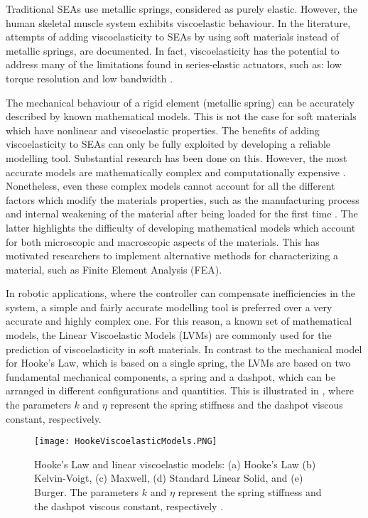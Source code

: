 Traditional SEAs use metallic springs, considered as purely elastic. However, the human skeletal muscle system exhibits viscoelastic behaviour. In the literature, attempts of adding viscoelasticity to SEAs by using soft materials instead of metallic springs, are documented. In fact, viscoelasticity has the potential to address many of the limitations found in series-elastic actuators, such as: low torque resolution and low bandwidth \cite{martins2015polyurethane,tagliamonte2014rendering,schepelmann2014compact}. 

The mechanical behaviour of a rigid element (metallic spring) can be accurately described by known mathematical models. This is not the case for soft materials which have nonlinear and viscoelastic properties. The benefits of adding viscoelasticity to SEAs can only be fully exploited by developing a  reliable modelling tool. Substantial research has been done on this. However, the most accurate models are mathematically complex and computationally expensive \cite{xu2014mathematical,ciniello2017identifying,lu2017constitutive}. Nonetheless, even these complex models cannot account for all the different factors which modify the materials properties, such as the manufacturing process and internal weakening of the material after being loaded for the first time \cite{case2015soft}. The latter highlights the difficulty of developing mathematical models which account for both microscopic and macroscopic aspects of the materials. This has motivated researchers to implement alternative methods for characterizing a material, such as Finite Element Analysis (FEA).

In robotic applications, where the controller can compensate inefficiencies in the system, a simple and fairly accurate modelling tool is preferred over a very accurate and highly complex one. For this reason, a known set of mathematical models, the Linear Viscoelastic Models (LVMs) are commonly used for the prediction of viscoelasticity in soft materials. In contrast to the mechanical model for Hooke's Law, which is based on a single spring, the LVMs are based on two fundamental mechanical components, a spring and a dashpot, which can be arranged in different configurations and quantities. This is illustrated in , where the parameters $k$ and $\eta$ represent the spring stiffness and the dashpot viscous constant, respectively.

\begin{figure}[hbt!]
	\centering
    \texttt{[image: HookeViscoelasticModels.PNG]}
    \caption[Hooke's Law and linear viscoelastic models: (a) Hooke's Law (b) Kelvin-Voigt, (c) Maxwell, (d) Standard Linear Solid, and (e) Burger. The parameters $k$ and $\eta$ represent the spring stiffness and the dashpot viscous constant, respectively.]{Hooke's Law and linear viscoelastic models: (a) Hooke's Law (b) Kelvin-Voigt, (c) Maxwell, (d) Standard Linear Solid, and (e) Burger. The parameters $k$ and $\eta$ represent the spring stiffness and the dashpot viscous constant, respectively \cite{austin2015control}. }
    \label{fig:LinearViscoelasticModels}
\end{figure}

